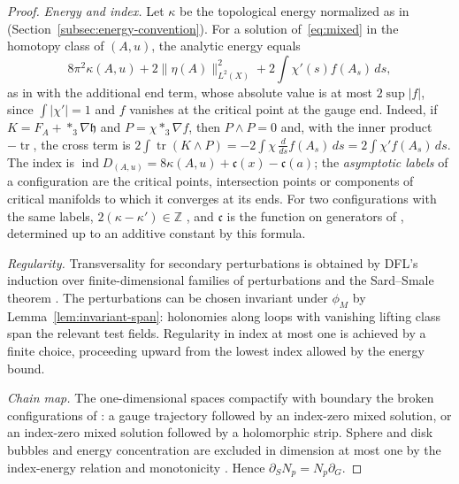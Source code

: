 \documentclass[11pt]{amsart}
\theoremstyle{definition}
\theoremstyle{remark}
\theoremstyle{plain}
\numberwithin{equation}{section}
\newcommand{\ZZ}{\mathbb{Z}}
\newcommand{\ind}{\operatorname{ind}}
\newcommand{\tr}{\operatorname{tr}}
\begin{document}
\begin{proof}
\emph{Energy and index.} Let $\kappa$ be the topological energy normalized as in
\cite[Proposition~3.20]{DFL} (Section~\ref{subsec:energy-convention}). For a solution
of~\eqref{eq:mixed} in the homotopy class of $(A,u)$, the analytic energy equals
\[
8\pi^2\kappa(A,u)+2\|\eta(A)\|^2_{L^2(X)}+2\int\chi'(s)f(A_s)\,ds ,
\]
as in \cite[(3.24)]{DFL} with the additional end term, whose absolute value is at most
$2\sup|f|$, since $\int|\chi'|=1$ and $f$ vanishes at the critical point at the
gauge end. Indeed, if $K=F_A+*_3\nabla\mathfrak h$ and
$P=\chi*_3\nabla f$, then $P\wedge P=0$ and, with the inner product
$-\tr$, the cross term is
$2\int\tr(K\wedge P)=-2\int\chi\,\frac{d}{ds}f(A_s)\,ds
=2\int\chi'f(A_s)\,ds$. The index is
$\ind D_{(A,u)}=8\kappa(A,u)+\mathfrak c(x)-\mathfrak c(a)$; the \emph{asymptotic labels} of a configuration are the
critical points, intersection points or components of critical manifolds to which it
converges at its ends. For two configurations with the same labels,
$2(\kappa-\kappa')\in\ZZ$ \cite[Lemma~3.15]{DFL}, and $\mathfrak c$ is the function on
generators of \cite[Proposition~2.53]{DFL}, determined up to an additive constant
by this formula.

\emph{Regularity.} Transversality for secondary perturbations is obtained
by DFL's induction over finite-dimensional families of perturbations and the
Sard--Smale theorem \cite[Section~6.2]{DFL}. The
perturbations can be chosen invariant under $\phi_M$ by
Lemma~\ref{lem:invariant-span}: holonomies along loops with vanishing lifting class span the relevant test fields. Regularity in index at most one
is achieved by a finite choice, proceeding upward from the lowest index
allowed by the energy bound.

\emph{Chain map.} The one-dimensional spaces compactify with boundary
the broken configurations of \cite[Proposition~3.26]{DFL}: a gauge
trajectory followed by an index-zero mixed solution, or an index-zero
mixed solution followed by a holomorphic strip. Sphere and disk bubbles
and energy concentration are excluded in dimension at most one by the
index-energy relation and monotonicity \cite[Section~5.4]{DFL}. Hence
$\partial_SN_p=N_p\partial_G$.


\end{proof}
\end{document}
